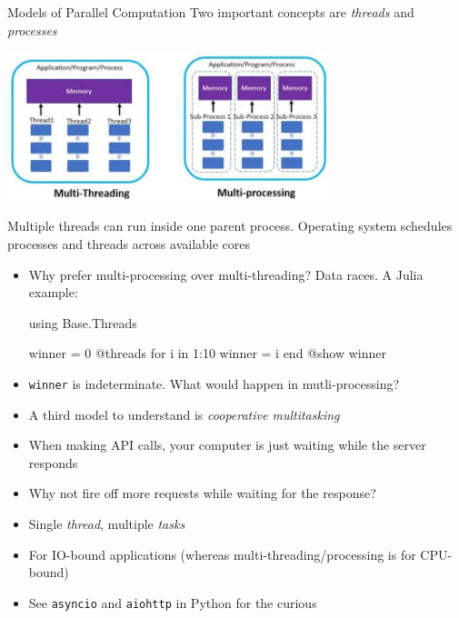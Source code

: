\documentclass[aspectratio=1610,handout]{beamer}
\begin{document}
\begin{frame}{Models of Parallel Computation}
    Two important concepts are \textit{threads} and \textit{processes}

    \begin{center}
        \includegraphics[width=0.7\textwidth]{mp vs mt.jpg}
    \end{center}

    Multiple threads can run inside one parent process. Operating system schedules processes and threads across available cores
    \newpage
    \begin{itemize}
        \item Why prefer multi-processing over multi-threading? Data races. A Julia example:
        \begin{jllisting}
using Base.Threads

winner = 0
@threads for i in 1:10
    winner = i
end
@show winner
        \end{jllisting}
        \item \texttt{winner} is indeterminate. What would happen in mutli-processing?
    \end{itemize}
    \newpage

    \begin{itemize}
        \item A third model to understand is \textit{cooperative multitasking}
        \pause
        \item When making API calls, your computer is just waiting while the server responds
        \item Why not fire off more requests while waiting for the response?
        \pause
        \item Single \textit{thread}, multiple \textit{tasks}
        \pause
        \item For IO-bound applications (whereas multi-threading/processing is for CPU-bound)
        \item See \texttt{asyncio} and \texttt{aiohttp} in Python for the curious
    \end{itemize}
\end{frame}
\end{document}
